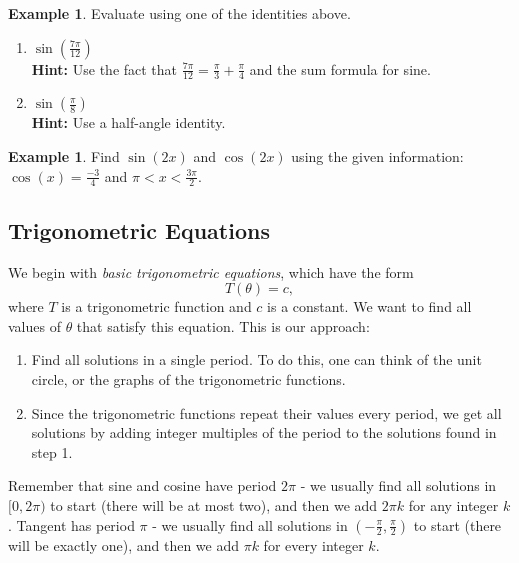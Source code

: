 \documentclass[letterpaper,12pt,oneside]{book}
\theoremstyle{definition}
\newtheorem{example}[theorem]{Example}
\begin{document}
{\begin{example}
Evaluate using one of the identities above.
\begin{enumerate}
\item $\sin\left(\frac{7\pi}{12}\right)$\\
\textbf{Hint:} Use the fact that $\frac{7\pi}{12}=\frac{\pi}{3}+\frac{\pi}{4}$ and the sum formula for sine.
\vfill
\item $\sin(\frac{\pi}{8})$\\
\textbf{Hint:} Use a half-angle identity.
\vfill
\end{enumerate}
\end{example}

\begin{example}
Find $\sin(2x)$ and $\cos(2x)$ using the given information: $\cos(x)=\tfrac{-3}{4}$ and $\pi<x<\frac{3\pi}{2}$.
\vfill
\end{example}



\subsection*{Trigonometric Equations}

We begin with \emph{basic trigonometric equations}, which have the form 
\[
T(\theta)=c,
\]
where $T$ is a trigonometric function and $c$ is a constant.   We want to find all values of $\theta$ that satisfy this equation.  This is our approach:
\begin{enumerate}[label=\arabic*.]
\item Find all solutions in a single period.  To do this, one can think of the unit circle, or the graphs of the trigonometric functions.
\item Since the trigonometric functions repeat their values every period, we get all solutions by adding integer multiples of the period  to the solutions found in step 1.
\end{enumerate}
Remember that sine and cosine have period $2\pi$ - we usually find all solutions in $[0,2\pi)$ to start (there will be at most two), and then we add $2\pi k$ for any integer $k$.  Tangent has period $\pi$ - we usually find all solutions in $\left(-\tfrac{\pi}{2},\tfrac{\pi}{2}\right)$ to start (there will be exactly one), and then we add $\pi k$ for every integer $k$.

}
\end{document}
